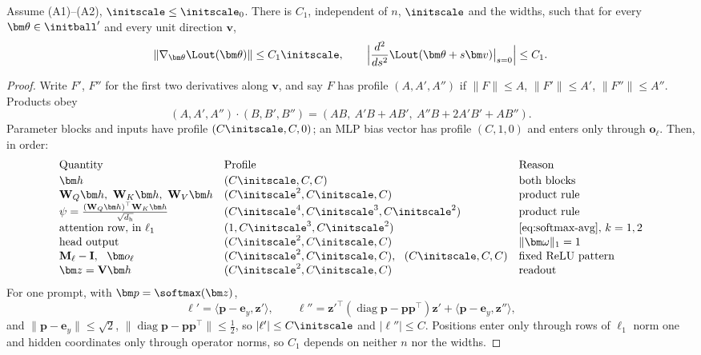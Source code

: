 \begin{lemma}
\label{lem:end-smooth}
Assume (A1)--(A2), $\initscale\le\initscale_0$. There is $C_1$, independent of $n$, $\initscale$ and the widths, such that for every $\bm\theta\in\initball'$ and
every unit direction $\bm v$,
\[
 \|\nabla_{\bm\theta}\Lout(\bm\theta)\|\le C_1\initscale,\qquad \Bigl|\frac{d^2}{ds^2}\Lout(\bm\theta+s\bm v)\big|_{s=0}\Bigr|\le C_1 .
\]
\end{lemma}

\begin{proof}
Write $F'$, $F''$ for the first two derivatives along $\bm v$, and say $F$ has profile $(A,A',A'')$ if $\|F\|\le A$, $\|F'\|\le A'$,
$\|F''\|\le A''$. Products obey
\[
 (A,A',A'')\cdot(B,B',B'')=(AB,\ A'B+AB',\ A''B+2A'B'+AB'').
\]
Parameter blocks and inputs have profile $(C\initscale,C,0)$; an MLP bias vector has profile $(C,1,0)$ and enters only through $\bm o_\ell$.
Then, in order:
\[
\begin{array}{@{}lll@{}}
 \text{Quantity} & \text{Profile} & \text{Reason}\\[2pt]
 \bm h & (C\initscale,C,C) & \text{both blocks}\\
 \mathbf W_Q\bm h,\ \mathbf W_K\bm h,\ \mathbf W_V\bm h & (C\initscale^2,C\initscale,C) & \text{product rule}\\
 \psi=\frac{(\mathbf W_Q\bm h)^\top \mathbf W_K\bm h}{\sqrt{d_{\mathrm h}}} & (C\initscale^4,C\initscale^3,C\initscale^2) & \text{product rule}\\
 \text{attention row, in }\ell_1 & (1,C\initscale^3,C\initscale^2) & \text{\cref{eq:softmax-avg}, }k=1,2\\
 \text{head output} & (C\initscale^2,C\initscale,C) & \|\bm\omega\|_1=1\\
 \mathbf M_\ell-\mathbf I,\ \ \bm o_\ell & (C\initscale^2,C\initscale,C),\ \ (C\initscale,C,C) & \text{fixed ReLU pattern}\\
 \bm z=\mathbf V\bm h & (C\initscale^2,C\initscale,C) & \text{readout}
\end{array}
\]
For one prompt, with $\bm p=\softmax(\bm z)$,
\[
 \ell'=\langle\bm p-\bm e_y,\bm z'\rangle,\qquad \ell''=\bm z'^\top(\operatorname{diag}\bm p-\bm p\bm p^\top)\bm z'+\langle\bm p-\bm e_y,\bm z''\rangle,
\]
and $\|\bm p-\bm e_y\|\le\sqrt2$, $\|\operatorname{diag}\bm p-\bm p\bm p^\top\|\le\frac{1}{2}$, so $|\ell'|\le C\initscale$ and $|\ell''|\le C$. Positions enter only through
rows of $\ell_1$ norm one and hidden coordinates only through operator norms, so $C_1$ depends on neither $n$ nor the widths.
\end{proof}

